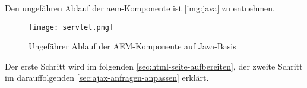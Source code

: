 Den ungefähren Ablauf der \ac{aem}-Komponente ist \autoref{img:java} zu entnehmen.
\begin{figure}[H]
	\begin{center}
		\texttt{[image: servlet.png]}
		\caption{Ungefährer Ablauf der AEM-Komponente auf Java-Basis}
		\label{img:java}
	\end{center}
\end{figure}

Der erste Schritt wird im folgenden \autoref{sec:html-seite-aufbereiten}, der zweite Schritt im darauffolgenden \autoref{sec:ajax-anfragen-anpassen} erklärt.


